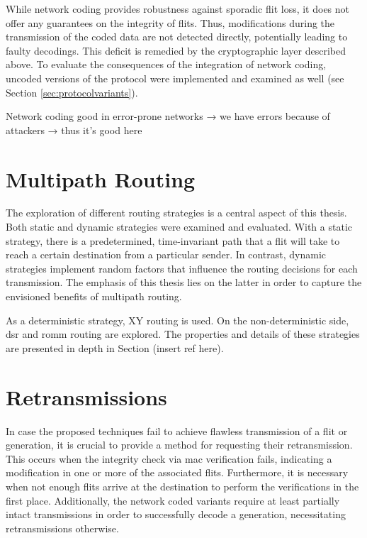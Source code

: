 While network coding provides robustness against sporadic flit loss, it does not offer any guarantees on the integrity of flits. Thus, modifications
during the transmission of the coded data are not detected directly, potentially leading to faulty decodings. This deficit is remedied by the cryptographic
layer described above. To evaluate the consequences of the integration of network coding, uncoded versions of the protocol were implemented and
examined as well (see Section \ref{sec:protocolvariants}).

Network coding good in error-prone networks → we have errors because of attackers → thus it's good here


\section{Multipath Routing}
The exploration of different routing strategies is a central aspect of this thesis. Both static and dynamic strategies were
examined and evaluated. With a static strategy, there is a predetermined, time-invariant path that a flit will take to reach a certain destination
from a particular sender. In contrast, dynamic strategies implement random factors that influence the routing decisions for each
transmission. The emphasis of this thesis lies on the latter in order to capture the envisioned benefits of multipath routing.

As a deterministic strategy, XY routing is used. On the non-deterministic side, \gls{dsr} and \gls{romm} routing are explored. The properties and
details of these strategies are presented in depth in Section (insert ref here).

\section{Retransmissions}\label{sec:retransmissions}
In case the proposed techniques fail to achieve flawless transmission of a flit or generation, it is crucial to provide a method for requesting
their retransmission. This occurs when the integrity check via \gls{mac} verification fails, indicating a modification in one or more of the
associated flits. Furthermore, it is necessary when not enough flits arrive at the destination to perform the verifications in the first place.
Additionally, the network coded variants require at least partially intact transmissions in order to successfully decode a generation, necessitating
retransmissions otherwise.

